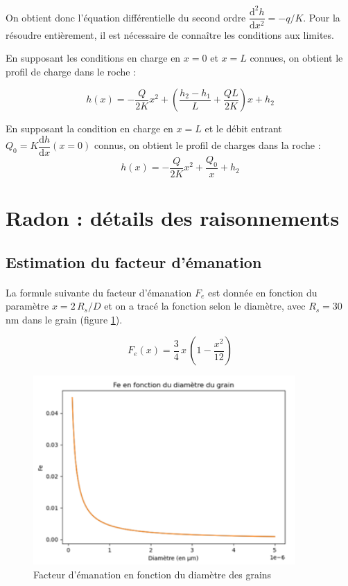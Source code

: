 \documentclass{article}
\begin{document}
On obtient donc l’équation différentielle du second ordre $\dfrac{\text{d}^2h}{\text{d}x^2}=-q/K$. 
Pour la résoudre entièrement, il est nécessaire de connaître les conditions aux limites. 

En supposant les conditions en charge en $x = 0$ et $x = L$ connues, on obtient le profil de charge dans le roche :

$$h(x) = -\frac{Q}{2K}x^2 + \left(\frac{h_2 - h_1}{L} + \frac{QL}{2K}\right)x + h_2$$


En supposant la condition en charge en $x = L$ et le débit entrant $Q_0 = K \dfrac{\text{d}h}{\text{d}x}(x = 0)$ connus, on obtient le profil de charges dans la roche :
$$h(x) = -\frac{Q}{2K}x^2 + \frac{Q_0}x + h_2$$

\newpage
\section{Radon : détails des raisonnements}
\subsection{Estimation du facteur d'émanation}
\label{annexe:emanation}

\paragraph{} La formule suivante du facteur d'émanation $F_e$ est donnée en fonction du paramètre $x=2\,R_s/D$ et on a tracé la fonction selon le diamètre, avec $R_s=30$ nm dans le grain (figure \ref{fig:facteur_emanation}).

$$
F_e (x)= \frac{3}{4} \,x\,(1- \frac{x^2}{12} )
$$

\begin{figure}[H]
    \centering
    \includegraphics[width=10cm]{II_A2_2.png}
    \caption{Facteur d’émanation en fonction du diamètre des grains}
    \label{fig:facteur_emanation}
\end{figure}
\end{document}
